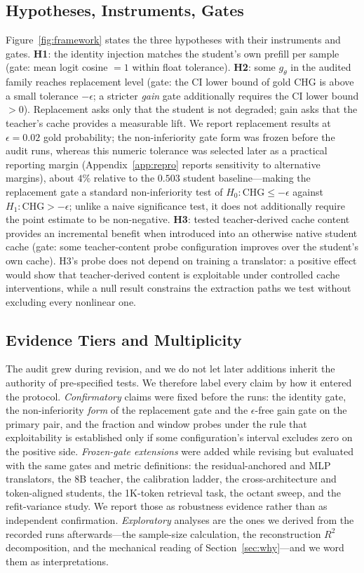 \documentclass[10pt]{article}
\newcommand{\chg}{\mathrm{CHG}}
\begin{document}
\subsection{Hypotheses, Instruments, Gates}
Figure~\ref{fig:framework} states the three hypotheses with their instruments
and gates. \textbf{H1}: the identity injection matches the student's own
prefill per sample (gate: mean logit cosine $= 1$ within float tolerance).
\textbf{H2}: some $g_\theta$ in the audited family reaches replacement level
(gate: the CI lower bound of gold CHG is above a small tolerance $-\epsilon$; a
stricter \emph{gain} gate additionally requires the CI lower bound $> 0$).
Replacement asks only that the student is not degraded; gain asks that the
teacher's cache provides a measurable lift. We report replacement results at $\epsilon = 0.02$ gold probability; the non-inferiority gate form was frozen before the audit runs, whereas this numeric tolerance was selected later as a practical reporting margin (Appendix~\ref{app:repro} reports sensitivity to alternative margins), about $4\%$ relative to the $0.503$ student baseline---making the replacement gate a
standard non-inferiority test of $H_0\colon \chg \le -\epsilon$ against
$H_1\colon \chg > -\epsilon$; unlike a naive significance test, it does not
additionally require the point estimate to be non-negative. \textbf{H3}:
tested teacher-derived cache content provides an incremental benefit when
introduced into an otherwise native student cache (gate: some teacher-content
probe configuration improves over the student's own cache). H3's probe does
not depend on training
a translator: a positive effect would show that teacher-derived content is
exploitable under controlled cache interventions, while a null result
constrains the extraction paths we test without excluding every nonlinear one.

\subsection{Evidence Tiers and Multiplicity}
\label{sec:tiers}
The audit grew during revision, and we do not let later additions inherit the
authority of pre-specified tests. We therefore label every claim by how it
entered the protocol. \emph{Confirmatory} claims were fixed before the runs: the
identity gate, the non-inferiority \emph{form} of the replacement gate and the $\epsilon$-free gain
gate on the primary pair, and the fraction and window probes under the rule that
exploitability is established only if some configuration's interval excludes
zero on the positive side. \emph{Frozen-gate extensions} were added while
revising but evaluated with the same gates and metric definitions: the
residual-anchored and MLP translators, the 8B teacher, the calibration ladder,
the cross-architecture and token-aligned students, the 1K-token retrieval task, the
octant sweep, and the refit-variance study. We report those as robustness
evidence rather than as independent confirmation. \emph{Exploratory} analyses
are the ones we derived from the recorded runs afterwards---the sample-size
calculation, the reconstruction $R^2$ decomposition, and the mechanical reading
of Section~\ref{sec:why}---and we word them as interpretations.
\end{document}
